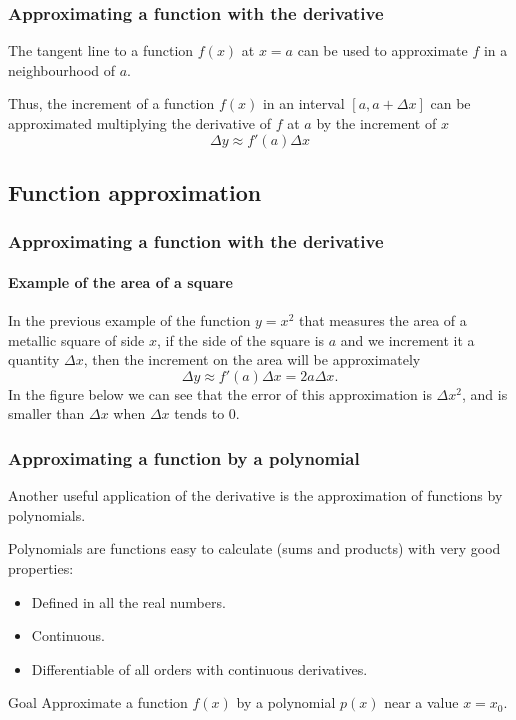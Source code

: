 \begin{frame}
\frametitle{Approximating a function with the derivative}
The tangent line to a function $f(x)$ at $x=a$ can be used to approximate $f$ in a neighbourhood of $a$.
\begin{center}

\end{center}
Thus, the increment of a function $f(x)$ in an interval $[a,a+\Delta x]$ can be approximated multiplying the derivative of $f$ at $a$ by the increment of $x$
\[
\Delta y \approx f'(a)\Delta x
\]
\end{frame}


\subsection{Function approximation}
\begin{frame}
\frametitle{Approximating a function with the derivative}
\framesubtitle{Example of the area of a square}
In the previous example of the function $y=x^2$ that measures the area of a metallic square of side $x$, if the side of the square is $a$ and we increment it a quantity $\Delta x$, then the increment on the area will be approximately
\[
\Delta y \approx f'(a)\Delta x = 2a\Delta x.
\]
In the figure below we can see that the error of this approximation is $\Delta x^2$, and is smaller than $\Delta x$ when $\Delta x$ tends to 0. 
\begin{center}
\end{center}
\end{frame}


\begin{frame}
\frametitle{Approximating a function by a polynomial}
Another useful application of the derivative is the approximation of functions by polynomials.

Polynomials are functions easy to calculate (sums and products) with very good properties:
\begin{itemize}
\item Defined in all the real numbers.
\item Continuous.
\item Differentiable of all orders with continuous derivatives.
\end{itemize}

\begin{block}{Goal}
Approximate a function $f(x)$ by a polynomial $p(x)$ near a value $x=x_0$.
\end{block}
\end{frame}



